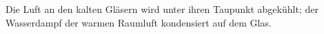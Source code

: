 Die Luft an den kalten Gläsern wird unter ihren Taupunkt abgekühlt; der Wasserdampf der warmen Raumluft kondensiert auf dem Glas.
